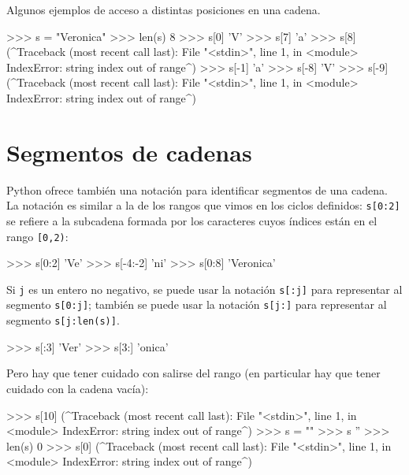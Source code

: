 Algunos ejemplos de acceso a distintas posiciones en una cadena.

\begin{codigo-python-sn}
>>> s = "Veronica"
>>> len(s)
8
>>> s[0]
'V'
>>> s[7]
'a'
>>> s[8]
(^Traceback (most recent call last):
  File "<stdin>", line 1, in <module>
IndexError: string index out of range^)
>>> s[-1]
'a'
>>> s[-8]
'V'
>>> s[-9]
(^Traceback (most recent call last):
  File "<stdin>", line 1, in <module>
IndexError: string index out of range^)
\end{codigo-python-sn}


\section{Segmentos de cadenas}

Python ofrece también una notación para identificar segmentos de una
cadena. La notación es similar a la de los rangos que vimos en los ciclos
definidos: \lstinline+s[0:2]+ se refiere a la subcadena formada por los
caracteres cuyos índices están en el rango \lstinline+[0,2)+:

\begin{codigo-python-sn}
>>> s[0:2]
'Ve'
>>> s[-4:-2]
'ni'
>>> s[0:8]
'Veronica'
\end{codigo-python-sn}

Si \lstinline!j! es un entero no negativo, se puede usar la notación
\lstinline+s[:j]+ para representar al segmento \lstinline+s[0:j]+; también
se puede usar la notación \lstinline+s[j:]+ para representar al segmento
\lstinline+s[j:len(s)]+.

\begin{codigo-python-sn}
>>> s[:3]
'Ver'
>>> s[3:]
'onica'
\end{codigo-python-sn}

Pero hay que tener cuidado con salirse del rango (en particular hay que
tener cuidado con la cadena vacía):

\begin{codigo-python-sn}
>>> s[10]
(^Traceback (most recent call last):
  File "<stdin>", line 1, in <module>
IndexError: string index out of range^)
>>> s = ""
>>> s
''
>>> len(s)
0
>>> s[0]
(^Traceback (most recent call last):
  File "<stdin>", line 1, in <module>
IndexError: string index out of range^)
\end{codigo-python-sn}

